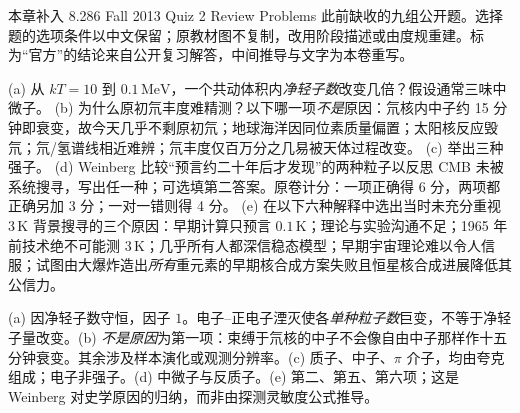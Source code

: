 本章补入 8.286 Fall 2013 Quiz 2 Review Problems 此前缺收的九组公开题。选择题的选项条件以中文保留；原教材图不复制，改用阶段描述或由度规重建。标为“官方”的结论来自公开复习解答，中间推导与文字为本卷重写。

\begin{exercise}
(a) 从 $kT=10$ 到 $0.1\,\mathrm{MeV}$，一个共动体积内\emph{净轻子数}改变几倍？假设通常三味中微子。
(b) 为什么原初氘丰度难精测？以下哪一项\emph{不是}原因：氘核内中子约 15 分钟即衰变，故今天几乎不剩原初氘；地球海洋因同位素质量偏置；太阳核反应毁氘；氘/氢谱线相近难辨；氘丰度仅百万分之几易被天体过程改变。
(c) 举出三种强子。
(d) Weinberg 比较“预言约二十年后才发现”的两种粒子以反思 CMB 未被系统搜寻，写出任一种；可选填第二答案。原卷计分：一项正确得 6 分，两项都正确另加 3 分；一对一错则得 4 分。
(e) 在以下六种解释中选出当时未充分重视 $3\,\mathrm K$ 背景搜寻的三个原因：早期计算只预言 $0.1\,\mathrm K$；理论与实验沟通不足；1965 年前技术绝不可能测 $3\,\mathrm K$；几乎所有人都深信稳态模型；早期宇宙理论难以令人信服；试图由大爆炸造出\emph{所有}重元素的早期核合成方案失败且恒星核合成进展降低其公信力。
\end{exercise}
\begin{solution}
(a) 因净轻子数守恒，因子 $1$。电子--正电子湮灭使各\emph{单种粒子数}巨变，不等于净轻子量改变。(b) \emph{不是原因}为第一项：束缚于氘核的中子不会像自由中子那样作十五分钟衰变。其余涉及样本演化或观测分辨率。(c) 质子、中子、$\pi$ 介子，均由夸克组成；电子非强子。(d) 中微子与反质子。(e) 第二、第五、第六项；这是 Weinberg 对史学原因的归纳，而非由探测灵敏度公式推导。
\end{solution}


